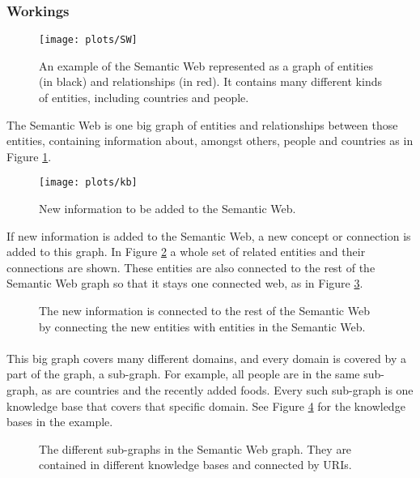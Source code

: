 \documentclass{article}
\begin{document}
 \subsubsection{Workings}
 \begin{figure}[H]
 \centering
 \texttt{[image: plots/SW]}
 \caption[Semantic Web graph]{An example of the Semantic Web represented as a graph of entities (in black) and relationships (in red). It contains many different kinds of entities, including countries and people.}
 \label{semantic_web}
 \end{figure}
 
 The Semantic Web is one big graph of entities and relationships between those entities, containing information about, amongst others, people and countries as in Figure \ref{semantic_web}.
 
 \begin{figure}[H]
 \centering
 \texttt{[image: plots/kb]}
 \caption[Knowledge base graph]{New information to be added to the Semantic Web.}
 \label{kb}
 \end{figure}
 
 If new information is added to the Semantic Web, a new concept or connection is added to this graph. In Figure \ref{kb} a whole set of related entities and their connections are shown. These entities are also connected to the rest of the Semantic Web graph so that it stays one connected web, as in Figure \ref{combine}.
 
 \begin{figure}[H]
 \centering
 \caption[Linking the knowledge base]{The new information is connected to the rest of the Semantic Web by connecting the new entities with entities in the Semantic Web.}
 \label{combine}
 \end{figure}
 
 \paragraph{}
 This big graph covers many different domains, and every domain is covered by a part of the graph, a sub-graph. For example, all people are in the same sub-graph, as are countries and the recently added foods. Every such sub-graph is one knowledge base that covers that specific domain. See Figure \ref{kbs} for the knowledge bases in the example.
 
 \begin{figure}[H]
 \centering
 \caption[Semantic Web knowledge base view]{The different sub-graphs in the Semantic Web graph. They are contained in different knowledge bases and connected by URIs.}
 \label{kbs}
 \end{figure}
 
\end{document}
